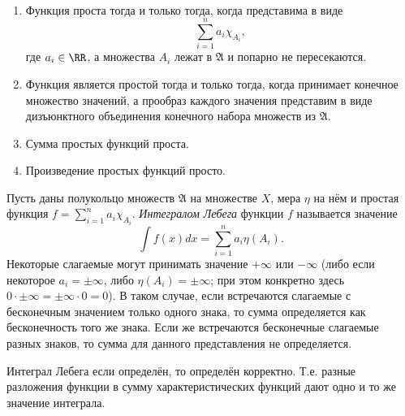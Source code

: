 \documentclass[12pt,a4paper]{article}
\begin{document}
    \begin{lemma}\ 
        \begin{enumerate}
            \item Функция проста тогда и только тогда, когда представима в виде
                \[\sum_{i=1}^n a_i \chi_{A_i},\]
                где $a_i \in \RR$, а множества $A_i$ лежат в $\mathfrak{A}$ и попарно не пересекаются.
            \item Функция является простой тогда и только тогда, когда принимает конечное множество значений, а прообраз каждого значения представим в виде дизъюнктного объединения конечного набора множеств из $\mathfrak{A}$.
            \item Сумма простых функций проста.
            \item Произведение простых функций просто.
        \end{enumerate}
    \end{lemma}

    \begin{definition}
        Пусть даны полукольцо множеств $\mathfrak{A}$ на множестве $X$, мера $\eta$ на нём и простая функция $f = \sum_{i=1}^n a_i \chi_{A_i}$. \emph{Интегралом Лебега} функции $f$ называется значение
        \[\int f(x) dx = \sum_{i=1}^n a_i \eta(A_i).\]
        Некоторые слагаемые могут принимать значение $+\infty$ или $-\infty$ (либо если некоторое $a_i = \pm \infty$, либо $\eta(A_i) = \pm \infty$; при этом конкретно здесь $0 \cdot \pm \infty = \pm \infty \cdot 0 = 0$). В таком случае, если встречаются слагаемые с бесконечным значением только одного знака, то сумма определяется как бесконечность того же знака. Если же встречаются бесконечные слагаемые разных знаков, то сумма для данного представления не определяется.
    \end{definition}

    \begin{theorem}
        Интеграл Лебега если определён, то определён корректно. Т.е. разные разложения функции в сумму характеристических функций дают одно и то же значение интеграла.
    \end{theorem}
\end{document}
